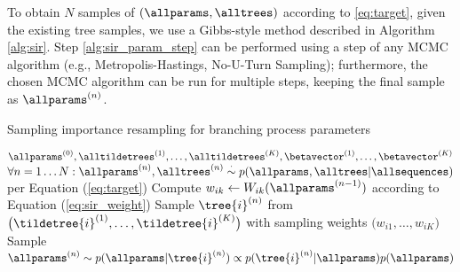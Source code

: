 To obtain $N$ samples of $(\allparams, \alltrees)$ according to \ref{eq:target}, given the existing tree samples, we use a Gibbs-style method described in Algorithm \ref{alg:sir}.
Step \ref{alg:sir_param_step} can be performed using a step of any MCMC algorithm (e.g., Metropolis-Hastings, No-U-Turn Sampling); furthermore, the chosen MCMC algorithm can be run for multiple steps, keeping the final sample as $\allparams^{(n)}$.

\begin{algorithm}
	\caption{Sampling importance resampling for branching process parameters} \label{alg:sir}
	\begin{algorithmic}[1]
	\Require $\allparams^{(0)}, \alltildetrees^{(1)}, \dots, \alltildetrees^{(K)}, \betavector^{(1)}, \dots, \betavector^{(K)}$
	\Ensure $\forall n = 1 \dots N : \allparams^{(n)}, \alltrees^{(n)} \stackrel{\cdot}{\sim} p(\allparams, \alltrees | \allsequences)$ per Equation (\ref{eq:target})
				\State Compute $w_{ik} \leftarrow W_{ik}(\allparams^{(n-1)})$ according to Equation (\ref{eq:sir_weight})
			\EndFor
			\State Sample $\tree{i}^{(n)}$ from $\big( \tildetree{i}^{(1)}, \dots, \tildetree{i}^{(K)} \big)$ with sampling weights $\big( w_{i1}, \dots, w_{iK} \big)$
		\EndFor
		\State Sample $\allparams^{(n)} \sim p(\allparams | \tree{i}^{(n)}) \propto p(\tree{i}^{(n)} | \allparams) p(\allparams)$ \label{alg:sir_param_step}
	\EndFor
	\end{algorithmic}
\end{algorithm}
